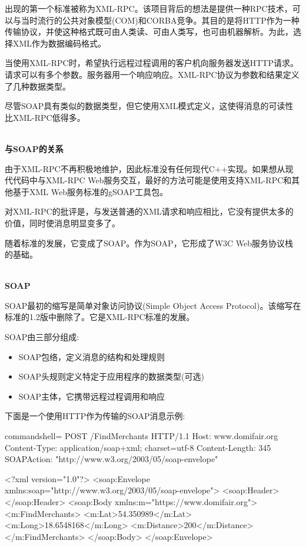 出现的第一个标准被称为XML-RPC。该项目背后的想法是提供一种RPC技术，可以与当时流行的公共对象模型(COM)和CORBA竞争。其目的是将HTTP作为一种传输协议，并使这种格式既可由人类读、可由人类写，也可由机器解析。为此，选择XML作为数据编码格式。

当使用XML-RPC时，希望执行远程过程调用的客户机向服务器发送HTTP请求。请求可以有多个参数。服务器用一个响应响应。XML-RPC协议为参数和结果定义了几种数据类型。

尽管SOAP具有类似的数据类型，但它使用XML模式定义，这使得消息的可读性比XML-RPC低得多。

\hspace*{\fill} \\ %
\noindent
\textbf{与SOAP的关系}

由于XML-RPC不再积极地维护，因此标准没有任何现代C++实现。如果想从现代代码中与XML-RPC Web服务交互，最好的方法可能是使用支持XML-RPC和其他基于XML Web服务标准的gSOAP工具包。

对XML-RPC的批评是，与发送普通的XML请求和响应相比，它没有提供太多的价值，同时使消息明显变多了。

随着标准的发展，它变成了SOAP。作为SOAP，它形成了W3C Web服务协议栈的基础。

\hspace*{\fill} \\ %
\noindent
\textbf{SOAP}

SOAP最初的缩写是简单对象访问协议(Simple Object Access Protocol)。该缩写在标准的1.2版中删除了。它是XML-RPC标准的发展。

SOAP由三部分组成:

\begin{itemize}
\item 
SOAP包络，定义消息的结构和处理规则

\item 
SOAP头规则定义特定于应用程序的数据类型(可选)

\item 
SOAP主体，它携带远程过程调用和响应
\end{itemize}

下面是一个使用HTTP作为传输的SOAP消息示例:

\begin{tcblisting}{commandshell={}}
POST /FindMerchants HTTP/1.1
Host: www.domifair.org
Content-Type: application/soap+xml; charset=utf-8
Content-Length: 345
SOAPAction: "http://www.w3.org/2003/05/soap-envelope"

<?xml version="1.0"?>
<soap:Envelope xmlns:soap="http://www.w3.org/2003/05/soap-envelope">
  <soap:Header>
  </soap:Header>
  <soap:Body xmlns:m="https://www.domifair.org">
    <m:FindMerchants>
      <m:Lat>54.350989</m:Lat>
      <m:Long>18.6548168</m:Long>
      <m:Distance>200</m:Distance>
    </m:FindMerchants>
  </soap:Body>
</soap:Envelope>
\end{tcblisting}

